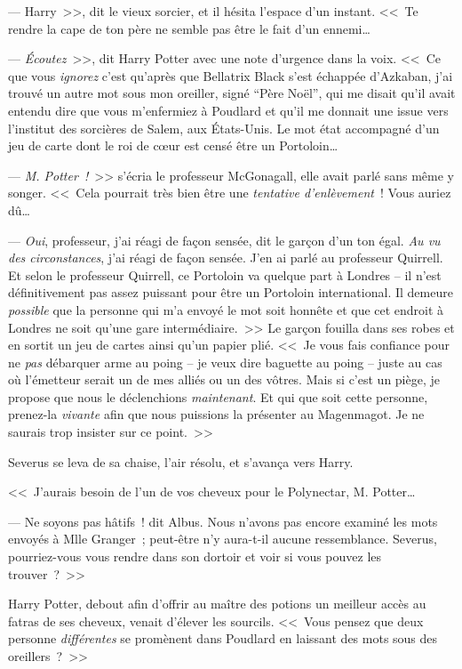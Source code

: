 --- Harry~>>, dit le vieux sorcier, et il hésita l'espace d'un instant. <<~Te rendre la cape de ton père ne semble pas être le fait d'un ennemi…

--- \emph{Écoutez}~>>, dit Harry Potter avec une note d'urgence dans la voix. <<~Ce que vous \emph{ignorez} c'est qu'après que Bellatrix Black s'est échappée d'Azkaban, j'ai trouvé un autre mot sous mon oreiller, signé “Père Noël”, qui me disait qu'il avait entendu dire que vous m'enfermiez à Poudlard et qu'il me donnait une issue vers l'institut des sorcières de Salem, aux États-Unis. Le mot état accompagné d'un jeu de carte dont le roi de cœur est censé être un Portoloin…

--- \emph{M. Potter~!}~>> s'écria le professeur McGonagall, elle avait parlé sans même y songer. <<~Cela pourrait très bien être une \emph{tentative d'enlèvement}~! Vous auriez dû…

--- \emph{Oui}, professeur, j'ai réagi de façon sensée, dit le garçon d'un ton égal. \emph{Au vu des circonstances}, j'ai réagi de façon sensée. J'en ai parlé au professeur Quirrell. Et selon le professeur Quirrell, ce Portoloin va quelque part à Londres -- il n'est définitivement pas assez puissant pour être un Portoloin international. Il demeure \emph{possible} que la personne qui m'a envoyé le mot soit honnête et que cet endroit à Londres ne soit qu'une gare intermédiaire.~>> Le garçon fouilla dans ses robes et en sortit un jeu de cartes ainsi qu'un papier plié. <<~Je vous fais confiance pour ne \emph{pas} débarquer arme au poing -- je veux dire baguette au poing -- juste au cas où l'émetteur serait un de mes alliés ou un des vôtres. Mais si c'est un piège, je propose que nous le déclenchions \emph{maintenant}. Et qui que soit cette personne, prenez-la \emph{vivante} afin que nous puissions la présenter au Magenmagot. Je ne saurais trop insister sur ce point.~>>

Severus se leva de sa chaise, l'air résolu, et s'avança vers Harry.

<<~J'aurais besoin de l'un de vos cheveux pour le Polynectar, M. Potter…

--- Ne soyons pas hâtifs~! dit Albus. Nous n'avons pas encore examiné les mots envoyés à Mlle Granger~; peut-être n'y aura-t-il aucune ressemblance. Severus, pourriez-vous vous rendre dans son dortoir et voir si vous pouvez les trouver~?~>>

Harry Potter, debout afin d'offrir au maître des potions un meilleur accès au fatras de ses cheveux, venait d'élever les sourcils. <<~Vous pensez que deux personne \emph{différentes} se promènent dans Poudlard en laissant des mots sous des oreillers~?~>>

